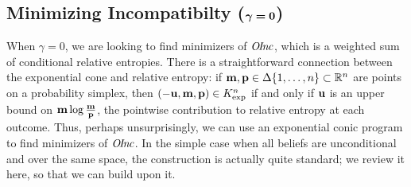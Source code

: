 \documentclass{article}
\newcommand\discard[1]{}
\newcommand\voli[1]{{\color{olicolor}\textbf{$\boldsymbol\{$Oli: }#1 \textbf{$\boldsymbol\}$}}}
\begin{document}

\subsection{%
    Minimizing Incompatibilty
    (\texorpdfstring{$\boldsymbol\gamma\boldsymbol=\mathbf{0}$}{gamma=0})%
} \label{sec:minimize-inc}

When $\gamma = 0$, we are looking to find minimizers of $\mathit{O\mskip-2.5muI\mskip-3.5mun\mskip-1.7muc}$,
which is a
weighted sum of conditional relative entropies.
There is a straightforward connection between the exponential cone and
relative entropy:
if $\mathbf{m}, \mathbf{p} \in
\Delta \{1, \ldots, n\}
\subset \mathbb R^n$ are points on
a probability simplex,
then $(-\mathbf{u}, \mathbf{m}, \mathbf{p}) \in K_{\exp}^n$ if and only if
$\mathbf{u}$ is an upper bound on $\mathbf{m} \log \frac{\mathbf{m}}{\mathbf{p}}$,
the pointwise contribution to relative entropy at each outcome.
Thus, perhaps unsurprisingly, we can use an exponential conic program to
find minimizers of $\mathit{O\mskip-2.5muI\mskip-3.5mun\mskip-1.7muc}$.
In the simple case when all beliefs are unconditional and over the same space,
the construction is actually quite standard;
we review it here, so that we can build upon it.
\end{document}
